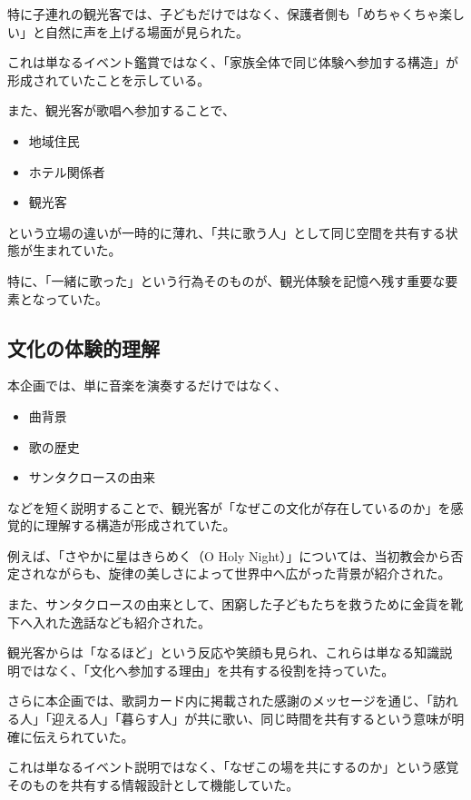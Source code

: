 特に子連れの観光客では、子どもだけではなく、保護者側も「めちゃくちゃ楽しい」と自然に声を上げる場面が見られた。

これは単なるイベント鑑賞ではなく、「家族全体で同じ体験へ参加する構造」が形成されていたことを示している。

また、観光客が歌唱へ参加することで、

\begin{itemize}
\item 地域住民
\item ホテル関係者
\item 観光客
\end{itemize}

という立場の違いが一時的に薄れ、「共に歌う人」として同じ空間を共有する状態が生まれていた。

特に、「一緒に歌った」という行為そのものが、観光体験を記憶へ残す重要な要素となっていた。


\subsection{文化の体験的理解}

本企画では、単に音楽を演奏するだけではなく、

\begin{itemize}
\item 曲背景
\item 歌の歴史
\item サンタクロースの由来
\end{itemize}

などを短く説明することで、観光客が「なぜこの文化が存在しているのか」を感覚的に理解する構造が形成されていた。

例えば、「さやかに星はきらめく（O Holy Night）」については、当初教会から否定されながらも、旋律の美しさによって世界中へ広がった背景が紹介された。

また、サンタクロースの由来として、困窮した子どもたちを救うために金貨を靴下へ入れた逸話なども紹介された。

観光客からは「なるほど」という反応や笑顔も見られ、これらは単なる知識説明ではなく、「文化へ参加する理由」を共有する役割を持っていた。

さらに本企画では、歌詞カード内に掲載された感謝のメッセージを通じ、「訪れる人」「迎える人」「暮らす人」が共に歌い、同じ時間を共有するという意味が明確に伝えられていた。

これは単なるイベント説明ではなく、「なぜこの場を共にするのか」という感覚そのものを共有する情報設計として機能していた。


